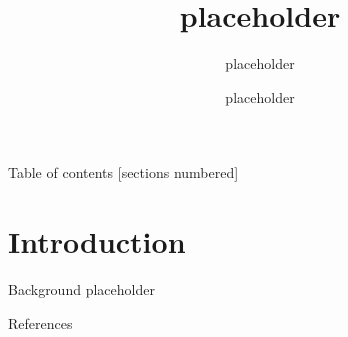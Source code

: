 \documentclass[10pt]{beamer}
\title{placeholder}
\subtitle{placeholder}
\date{}
\author{placeholder}
\institute{The Hong Kong Polytechnic University}
\newcommand{\themename}{\textbf{\textsc{metropolis}}\xspace}
\begin{document}
\graphicspath{{img/}}
\maketitle

\begin{frame}{Table of contents}
  [sections numbered]
  \tableofcontents%
\end{frame}

\section[Introduction]{Introduction}
\begin{frame}{Background}
placeholder
\end{frame}


\begin{frame}[allowframebreaks]{References}

  
  

\end{frame}




\end{document}
